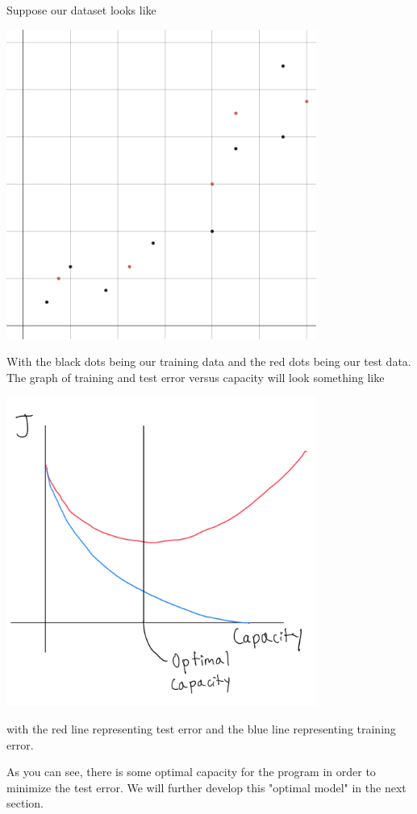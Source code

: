 Suppose our dataset looks like
\begin{center}
    \includegraphics[width=4in]{images/Chapter7/Chapter 7 dataset.png}
\end{center}
With the black dots being our training data and the red dots being our test data. The graph of training and test error versus capacity will look something like
\begin{center}
    \includegraphics[width=4in]{images/Chapter7/Training vs Test Error.png}
\end{center}
with the red line representing test error and the blue line representing training error.

As you can see, there is some optimal capacity for the program in order to minimize the test error. We will further develop this "optimal model" in the next section.

